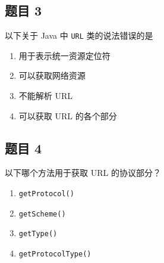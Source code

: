 \documentclass[12pt,a4paper]{ctexart}
\begin{document}
\subsection*{题目 3}
以下关于 Java 中 \texttt{URL} 类的说法错误的是
\begin{enumerate}[label=\Alph*.]
    \item 用于表示统一资源定位符
    \item 可以获取网络资源
    \item 不能解析 URL
    \item 可以获取 URL 的各个部分
\end{enumerate}

\subsection*{题目 4}
以下哪个方法用于获取 URL 的协议部分？
\begin{enumerate}[label=\Alph*.]
    \item \texttt{getProtocol()}
    \item \texttt{getScheme()}
    \item \texttt{getType()}
    \item \texttt{getProtocolType()}
\end{enumerate}
\end{document}
